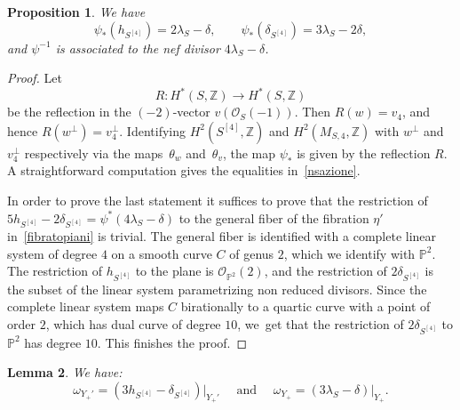 \documentclass[11pt]{article}
\let\oldbot\bot
\renewcommand{\bot}{{\scriptscriptstyle\oldbot}}
\newcommand{\PP}{{\mathbb P}}\let\P\PP
\newcommand{\ZZ}{{\mathbb Z}}\let\Z\ZZ
\newcommand\cO{\mathcal{O}}
\newtheorem{lemm}{Lemma}[section]
\newtheorem{prop}[lemm]{Proposition}
\theoremstyle{definition}
\begin{document}
\begin{prop}\label{prop:NefConeHilb4}
We have
\begin{equation}\label{nsazione}
\psi_{*}(h_{S^{[4]}}) = 2 \lambda_S - \delta, \qquad \psi_{*}(\delta_{S^{[4]}}) = 3 \lambda_S - 2\delta,
\end{equation}
and $\psi^{-1}$ is associated to the nef divisor $4 \lambda_S - \delta$.
\end{prop}

\begin{proof}
Let
\[
R\colon H^*(S,\ZZ)\to H^*(S,\ZZ)
\]
be the reflection in the $(-2)$-vector $v(\cO_S(-1))$. Then $R(w)\!=\!v_4$, and hence \hbox{$R(w^{\bot})\!=\!v_4^{\bot}$}. Identifying $H^2(S^{[4]},\ZZ)$ and $H^2(M_{S,4},\ZZ)$ with $w^{\bot}$ and $v_4^{\bot}$ respectively via the maps~$\theta_w$ and~$\theta_v$, the map $\psi_{*}$ is given by the reflection $R$. A straightforward computation gives the equalities in~\eqref{nsazione}.

In order to prove the last statement it suffices to prove that the restriction of $5h_{S^{[4]}}-2\delta_{S^{[4]}}=\psi^{*}(4\lambda_S-\delta)$ to the general fiber of the fibration $\eta'$ in~\eqref{fibratopiani} is trivial. The general fiber is identified with a complete linear system of degree $4$ on a smooth curve $C$ of genus $2$, which we identify with $\PP^2$. The restriction of $h_{S^{[4]}}$ to the plane is $\cO_{\PP^2}(2)$, and the restriction of $2\delta_{S^{[4]}}$ is the subset of the linear system parametrizing non reduced divisors. Since the complete linear system maps $C$ birationally to a quartic curve with a point of order $2$, which has dual curve of degree $10$, we~get that the restriction of $2\delta_{S^{[4]}}$ to $\PP^2$ has degree $10$. This finishes the proof.
\end{proof}

\begin{lemm}\label{lem:CanonicalDivisors}
We have:
\[
\omega_{Y_+'} = (3 h_{S^{[4]}} - \delta_{S^{[4]}})\vert_{Y_+'} \quad
\text{ and }\quad \omega_{Y_+} = (3 \lambda_S - \delta)\vert_{Y_+}.
\]
\end{lemm}
\end{document}
